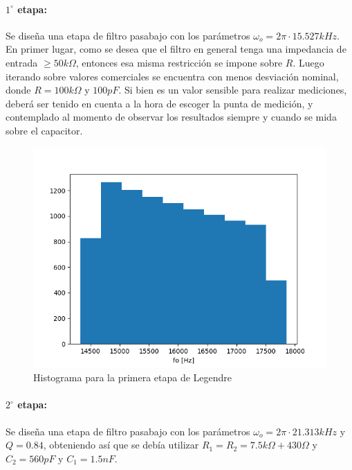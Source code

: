 \paragraph{$1^{\circ}$ etapa:} Se dise\~na una etapa de filtro pasabajo con los par\'ametros $\omega_o = 2 \pi \cdot 15.527 kHz$. En primer lugar, como se desea que el filtro en general tenga una impedancia de entrada $\geq 50k \Omega$, entonces
esa misma restricci\'on se impone sobre $R$. Luego iterando sobre valores comerciales se encuentra con menos desviaci\'on nominal, donde $R = 100k \Omega$ y $100pF$. Si bien es un valor sensible para realizar mediciones, deber\'a ser tenido en cuenta
a la hora de escoger la punta de medici\'on, y contemplado al momento de observar los resultados siempre y cuando se mida sobre el capacitor.

\begin{figure}[H]
    \centering
    \includegraphics[scale=0.7]{../EJ1/Recursos/legendre_histogram_one.png}
    \caption{Histograma para la primera etapa de Legendre}
    \label{fig:legendre_histogram_one}
\end{figure}

\paragraph{$2^{\circ}$ etapa:} Se dise\~na una etapa de filtro pasabajo con los par\'ametros $\omega_o = 2 \pi \cdot 21.313kHz$ y $Q = 0.84$, obteniendo as\'i que se deb\'ia utilizar $R_1 = R_2 = 7.5k\Omega + 430 \Omega$ y $C_2 = 560pF$ y $C_1 = 1.5nF$.

